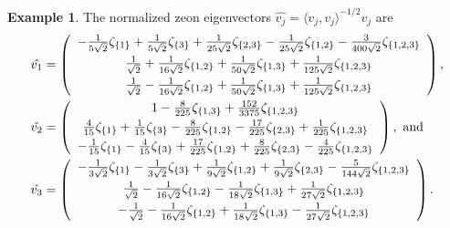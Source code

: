 \documentclass{article}
\theoremstyle{definition}
\newtheorem{example}[theorem]{Example}
\numberwithin{equation}{section}
\begin{document}
\begin{example}
The normalized zeon eigenvectors $\hat{v_j}=\langle v_j, v_j\rangle^{-1/2}v_j$ are \begin{align*}
\hat{v_1}&=\left(
\begin{array}{c}
-\frac{1}{5 \sqrt{2}}\zeta _{\{1\}}+\frac{1}{5 \sqrt{2}}\zeta _{\{3\}} + \frac{1}{25 \sqrt{2}}\zeta _{\{2,3\}}-\frac{1}{25 \sqrt{2}}\zeta _{\{1,2\}}-\frac{3}{400 \sqrt{2}}\zeta _{\{1,2,3\}}\vspace{3pt}\\
 \frac{1}{\sqrt{2}}+\frac{1}{16 \sqrt{2}}\zeta _{\{1,2\}}+\frac{1}{50 \sqrt{2}}\zeta _{\{1,3\}}+\frac{1}{125 \sqrt{2}}\zeta _{\{1,2,3\}} \vspace{3pt}\\
\frac{1}{\sqrt{2}} -\frac{1}{16 \sqrt{2}}\zeta _{\{1,2\}}+\frac{1}{50 \sqrt{2}}\zeta _{\{1,3\}}+\frac{1}{125 \sqrt{2}}\zeta _{\{1,2,3\}} 
\end{array}
\right),\\
\hat{v_2}&=\left(
\begin{array}{c}
1 -\frac{8}{225}\zeta _{\{1,3\}}+\frac{152}{3375}\zeta _{\{1,2,3\}} \vspace{3pt}\\
 \frac{4}{15} \zeta _{\{1\}}+\frac{1}{15}\zeta _{\{3\}}-\frac{8}{225} \zeta _{\{1,2\}}-\frac{17}{225} \zeta _{\{2,3\}}+\frac{1}{225} \zeta _{\{1,2,3\}} \vspace{3pt}\\
 -\frac{1}{15}\zeta _{\{1\}}-\frac{4}{15} \zeta _{\{3\}}+\frac{17}{225} \zeta _{\{1,2\}}+\frac{8}{225} \zeta _{\{2,3\}}-\frac{4}{225} \zeta _{\{1,2,3\}} 
\end{array}
\right),\text{ \rm and}\\
\hat{v_3}&=\left(
\begin{array}{c}
 -\frac{1}{3 \sqrt{2}}\zeta _{\{1\}}-\frac{1}{3 \sqrt{2}}\zeta _{\{3\}}+\frac{1}{9 \sqrt{2}}\zeta _{\{1,2\}}+\frac{1}{9 \sqrt{2}}\zeta _{\{2,3\}}-\frac{5}{144 \sqrt{2}}\zeta _{\{1,2,3\}}\vspace{3pt} \\
 \frac{1}{\sqrt{2}}-\frac{1}{16 \sqrt{2}}\zeta _{\{1,2\}}-\frac{1}{18 \sqrt{2}}\zeta _{\{1,3\}} +\frac{1}{27 \sqrt{2}}\zeta _{\{1,2,3\}}\vspace{3pt}\\
 -\frac{1}{\sqrt{2}} -\frac{1}{16 \sqrt{2}}\zeta _{\{1,2\}}+\frac{1}{18 \sqrt{2}}\zeta _{\{1,3\}}-\frac{1}{27 \sqrt{2}}\zeta _{\{1,2,3\}}
\end{array}
\right).
\end{align*}



\end{example}
\end{document}
